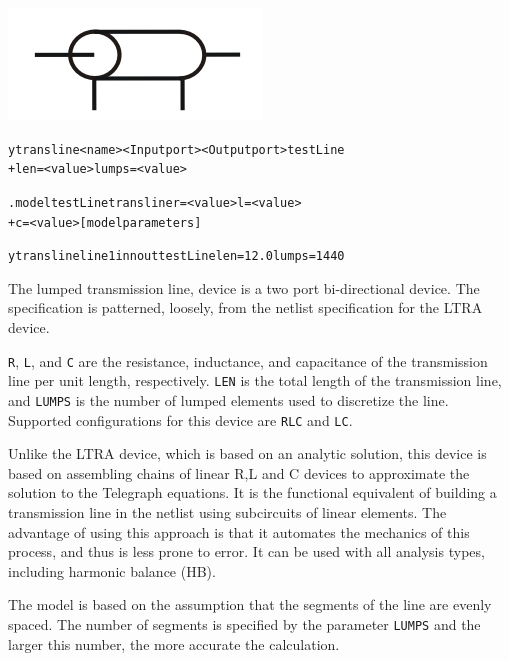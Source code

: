 


\begin{Device}

\symbol
{\includegraphics{translineSymbol}}

\device
\begin{alltt}
ytransline <name> <Input port> <Output port> testLine 
+ len=<value> lumps=<value>
\end{alltt}

\model
\begin{alltt}
.model testLine transline r=<value> l=<value> 
+ c=<value> [model parameters]
\end{alltt}

\examples
\begin{alltt}
ytransline line1 inn out  testLine len=12.0 lumps=1440
\end{alltt}

\comments
The lumped transmission line, device is a two port bi-directional device.   The specification
is patterned, loosely, from the netlist specification for the LTRA device.

\texttt{R}, \texttt{L}, and \texttt{C}  are the resistance,
inductance, and capacitance of the transmission line per unit
length, respectively. \texttt{LEN} is the total length of the transmission
line, and \texttt{LUMPS} is the number of lumped elements used to discretize the line. 
Supported configurations for this device are \texttt{RLC} and \texttt{LC}.

Unlike the LTRA device, which is based on an analytic solution, this device is 
based on assembling chains of linear R,L and C devices to approximate the 
solution to the Telegraph equations.  It is the functional equivalent of building a
transmission line in the netlist using subcircuits of linear elements.  The advantage
of using this approach is that it automates the mechanics of this process, and
thus is less prone to error.  It can be used with all analysis types, including
harmonic balance (HB).

The model is based on the assumption that the segments of the line are evenly spaced.
The number of segments is specified by the parameter \texttt{LUMPS} and the larger 
this number, the more accurate the calculation.
\end{Device}

